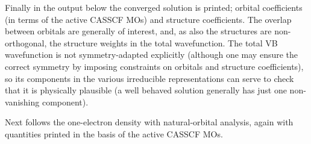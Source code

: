 Finally in the output below the converged 
solution is printed; orbital coefficients (in terms of the active CASSCF MOs) 
and structure coefficients. The overlap between orbitals are generally of 
interest, and, as also the structures are non-orthogonal, the structure weights 
in the total wavefunction. The total VB wavefunction is not symmetry-adapted 
explicitly (although one may ensure the correct symmetry by imposing constraints
on orbitals and structure coefficients), so its components in the various 
irreducible representations can serve to check that it is physically plausible 
(a well behaved solution generally has just one non-vanishing component).

Next follows the one-electron density with natural-orbital analysis, again with 
quantities printed in the basis of the active CASSCF MOs.

